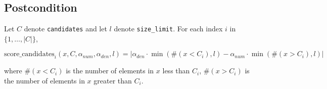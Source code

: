 \documentclass{article}
\begin{document}
\subsection*{Postcondition}

\begin{theorem}
    Let $C$ denote \texttt{candidates} and let $l$ denote \texttt{size\_limit}.
    For each index $i$ in $\{1, \ldots, |C|\}$,

    \begin{equation*}
        \mathrm{score\_candidates}_i(x, C, \alpha_{num}, \alpha_{den}, l) = |\alpha_{den} \cdot \min(\#(x < C_i), l) - \alpha_{num} \cdot \min(\#(x > C_i), l)|
    \end{equation*}

    where $\#(x < C_i)$ is the number of elements in $x$ less than $C_i$,
    $\#(x > C_i)$ is the number of elements in $x$ greater than $C_i$.
\end{theorem}
\end{document}
